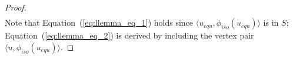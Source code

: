 \begin{proof}
\begin{eqnarray}
    \end{eqnarray}
    Note that Equation~(\ref{eq:llemma_eq_1}) holds since $\langle u_{equ},\phi_{iso}(u_{equ}) \rangle$ is in $S$; Equation~(\ref{eq:llemma_eq_2}) is derived by including the vertex pair $\langle u, \phi_{iso}(u_{equ})\rangle$.
\end{proof}

